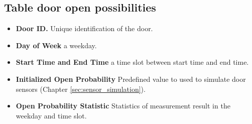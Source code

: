 \subsection*{Table door open possibilities}
\begin{itemize}
 \item \textbf{Door ID.} Unique identification of the door. 
 \item \textbf{Day of Week} a weekday.
 \item \textbf{Start Time and End Time} a time slot between start time and end time.
 \item \textbf{Initialized Open Probability} Predefined value to used to simulate door sensors (Chapter \ref{sec:sensor_simulation}).
 \item \textbf{Open Probability Statistic} Statistics of measurement result in the weekday and time slot.
 \begin{table}
 \centering
 \caption{Door Open Probability.}
 \label{tab:db_open_possibilities}
 \end{table}
\end{itemize}

